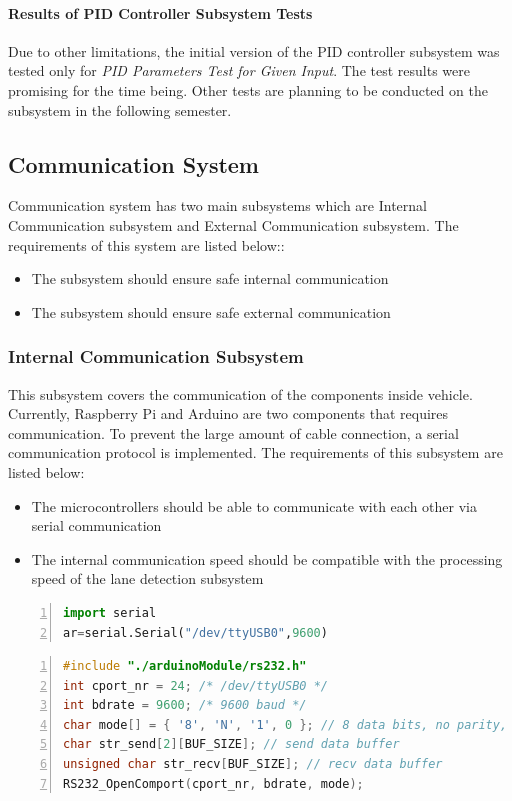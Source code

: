 \documentclass[a4paper,12pt]{article}
\begin{document}
		
		
	\paragraph{Results of PID Controller Subsystem Tests}
	
		Due to other limitations, the initial version of the PID controller subsystem was tested only for \textit{PID Parameters Test for Given Input}. The test results were promising for the time being. Other tests are planning to be conducted on the subsystem in the following semester.
	
	\subsection{Communication System}
	
	Communication system has two main subsystems which are Internal Communication subsystem and External Communication  subsystem. The requirements of this system are listed below::
	\begin{itemize}
		\item The subsystem should ensure safe internal communication
		\item The subsystem should ensure safe external communication
	\end{itemize}
	
	
	
	\subsubsection{Internal Communication Subsystem}
	This subsystem covers the communication of the components inside vehicle. Currently, Raspberry Pi and Arduino are two components that requires communication. To prevent the large amount of cable connection, a serial communication protocol is implemented. The requirements of this subsystem are listed below:
	\begin{itemize}
		\item The microcontrollers should be able to communicate with each other via serial communication
		\item The internal communication speed should be compatible with the processing speed of the lane detection subsystem  
	\end{itemize}
		\begin{lstlisting}[language=Python,float=h!,numbers=left,frame=single,caption=Serial object decleration in Python,label=sc:serial_python, captionpos=b ] 
import serial
ar=serial.Serial("/dev/ttyUSB0",9600)
		\end{lstlisting}
		 \begin{lstlisting}[language=C,float=h!,numbers=left,frame=single,caption=Serial communication setup in C,label=sc:serial_c, captionpos=b ] 
#include "./arduinoModule/rs232.h"
int cport_nr = 24; /* /dev/ttyUSB0 */
int bdrate = 9600; /* 9600 baud */
char mode[] = { '8', 'N', '1', 0 }; // 8 data bits, no parity, 1 stop bit
char str_send[2][BUF_SIZE]; // send data buffer
unsigned char str_recv[BUF_SIZE]; // recv data buffer
RS232_OpenComport(cport_nr, bdrate, mode);
		\end{lstlisting}
\end{document}
